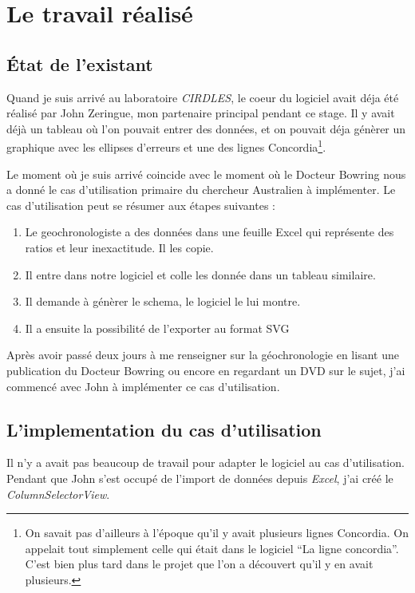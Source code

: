 \chapter{Le travail réalisé}

%
%
%
\section{État de l'existant}
Quand je suis arrivé au laboratoire \textit{CIRDLES}, le coeur du logiciel avait déja été réalisé par John Zeringue, mon partenaire principal pendant ce stage. Il y avait déjà un tableau où l'on pouvait entrer des données, et on pouvait déja génèrer un graphique avec les ellipses d'erreurs et une des lignes Concordia\footnote{On savait pas d'ailleurs à l'époque qu'il y avait plusieurs lignes Concordia. On appelait tout simplement celle qui était dans le logiciel ``La ligne concordia''. C'est bien plus tard dans le projet que l'on a découvert qu'il y en avait plusieurs.}.

Le moment où je suis arrivé coincide avec le moment où le Docteur Bowring nous a donné le cas d'utilisation primaire du chercheur Australien à implémenter. Le cas d'utilisation peut se résumer aux étapes suivantes :
\begin{enumerate}
\item Le geochronologiste a des données dans une feuille Excel qui représente des ratios et leur inexactitude. Il les copie.
\item Il entre dans notre logiciel et colle les donnée dans un tableau similaire.
\item Il demande à génèrer le schema, le logiciel le lui montre.
\item Il a ensuite la possibilité de l'exporter au format SVG
\end{enumerate}

Après avoir passé deux jours à me renseigner sur la géochronologie en lisant une publication du Docteur Bowring ou encore en regardant un DVD sur le sujet, %
j'ai commencé avec John à implémenter ce cas d'utilisation.

%
%
%
\section{L'implementation du cas d'utilisation}
Il n'y a avait pas beaucoup de travail pour adapter le logiciel au cas d'utilisation. Pendant que John s'est occupé de l'import de données depuis \textit{Excel}, j'ai créé le \textit{ColumnSelectorView}.

